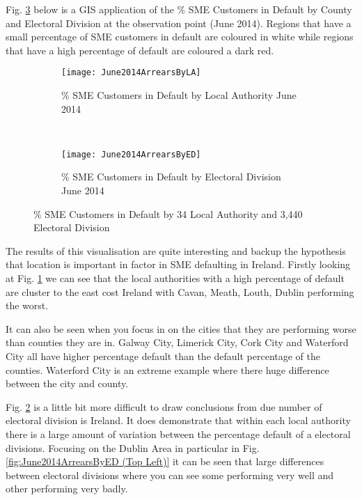 Fig. \ref{fig:SMEArrearsLAED} below is a GIS application of the \% SME Customers in Default by County and Electoral Division at the observation point (June 2014). Regions that have a small percentage of SME customers in default are coloured in white while regions that have a high percentage of default are coloured a dark red.
\begin{figure}[H]
	\begin{adjustwidth}{-2cm}{-2cm}
	\begin{subfigure}[b]{0.55\textwidth}
		\captionsetup{font=scriptsize}
		\texttt{[image: June2014ArrearsByLA]}
		\caption{\% SME Customers in Default by Local Authority June 2014}\label{fig:June2014ArrearsByLA}
	\end{subfigure} ~\quad
	\begin{subfigure}[b]{0.55\textwidth}
		\captionsetup{font=scriptsize}
		\texttt{[image: June2014ArrearsByED]}
		\caption{\% SME Customers in Default by Electoral Division June 2014}
		\label{fig:June2014ArrearsByED}
	\end{subfigure}
	\caption{\% SME Customers in Default by 34 Local Authority and 3,440 Electoral Division}
	\label{fig:SMEArrearsLAED}
	\end{adjustwidth}
\end{figure}

The results of this visualisation are quite interesting and backup the hypothesis that location is important in factor in SME defaulting in Ireland. Firstly looking at Fig. \ref{fig:June2014ArrearsByLA} we can see that the local authorities with a high percentage of default are cluster to the east cost Ireland with Cavan, Meath, Louth, Dublin performing the worst. 

It can also be seen when you focus in on the cities that they are performing worse than counties they are in. Galway City, Limerick City, Cork City and Waterford City all have higher percentage default than the default percentage of the counties. Waterford City is an extreme example where there huge difference between the city and county.

Fig. \ref{fig:June2014ArrearsByED} is a little bit more difficult to draw conclusions from due number of electoral division is Ireland. It does demonstrate that within each local authority there is a large amount of variation between the percentage default of a electoral divisions. Focusing on the Dublin Area in particular in Fig. \ref{fig:June2014ArrearsByED (Top Left)} it can be seen that large differences between electoral divisions where you can see some performing very well and other performing very badly. 
 
